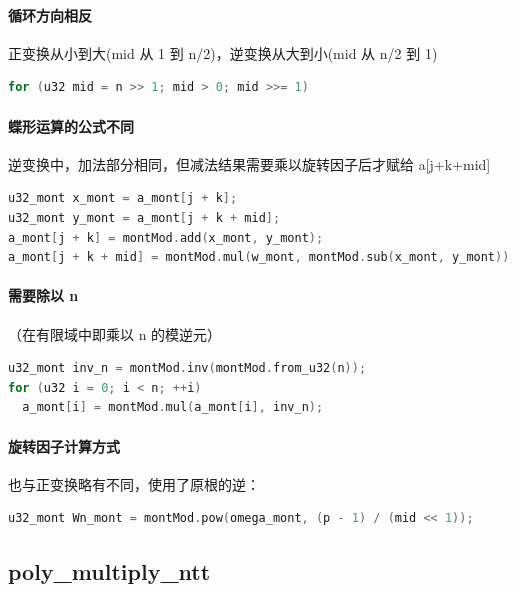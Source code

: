 \documentclass[a4paper]{article}
\begin{document}
\paragraph{循环方向相反}

正变换从小到大(mid 从 1 到 n/2)，逆变换从大到小(mid 从 n/2 到 1)

\begin{lstlisting}[language=C++]
for (u32 mid = n >> 1; mid > 0; mid >>= 1)
\end{lstlisting}

\paragraph{蝶形运算的公式不同}

逆变换中，加法部分相同，但减法结果需要乘以旋转因子后才赋给 a[j+k+mid]

\begin{lstlisting}[language=C++]
u32_mont x_mont = a_mont[j + k];
u32_mont y_mont = a_mont[j + k + mid];
a_mont[j + k] = montMod.add(x_mont, y_mont);
a_mont[j + k + mid] = montMod.mul(w_mont, montMod.sub(x_mont, y_mont));
\end{lstlisting}

\paragraph{需要除以 n}

（在有限域中即乘以 n 的模逆元）

\begin{lstlisting}[language=C++]
u32_mont inv_n = montMod.inv(montMod.from_u32(n));
for (u32 i = 0; i < n; ++i)
  a_mont[i] = montMod.mul(a_mont[i], inv_n);
\end{lstlisting}

\paragraph{旋转因子计算方式}

也与正变换略有不同，使用了原根的逆：

\begin{lstlisting}[language=C++]
u32_mont Wn_mont = montMod.pow(omega_mont, (p - 1) / (mid << 1));
\end{lstlisting}

\subsection{poly\_multiply\_ntt}
\end{document}
